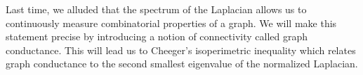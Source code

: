 Last time, we alluded that the spectrum of the Laplacian allows us to continuously measure combinatorial properties of a graph. We will make this statement precise by introducing a notion of connectivity called graph conductance. This will lead us to Cheeger's isoperimetric inequality which relates graph conductance to the second smallest eigenvalue of the normalized Laplacian.
